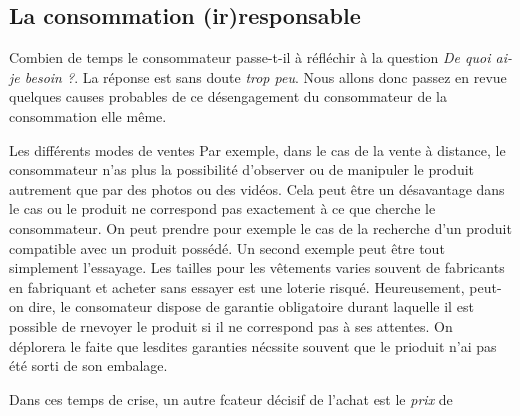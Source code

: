 \subsection{La consommation (ir)responsable}

Combien de temps le consommateur passe-t-il à réfléchir à la question \textit{De quoi ai-je besoin ?}.
La réponse est sans doute \textit{trop peu}. Nous allons donc passez en revue quelques causes probables de ce désengagement du consommateur de la consommation elle même.

\medbreak
Les différents modes de ventes 
Par exemple, dans le cas de la vente à distance, le consommateur n'as plus la possibilité d'observer ou de manipuler le produit autrement que par des photos ou des vidéos.
Cela peut être un désavantage dans le cas ou le produit ne correspond pas exactement à ce que cherche le consommateur.
\medbreak
On peut prendre pour exemple le cas de la recherche d'un produit compatible avec un produit possédé.
Un second exemple peut être tout simplement l'essayage. Les tailles pour les vêtements varies souvent de fabricants en fabriquant et acheter sans essayer est une loterie risqué.
\smallbreak
Heureusement, peut-on dire, le consomateur dispose de garantie obligatoire durant laquelle il est possible de rnevoyer le produit si il ne correspond pas à ses attentes. On déplorera le faite que lesdites garanties nécssite souvent que le prioduit n'ai pas été sorti de son embalage.

\medbreak
Dans ces temps de crise, un autre fcateur décisif de l'achat est le \textit{prix} de 


